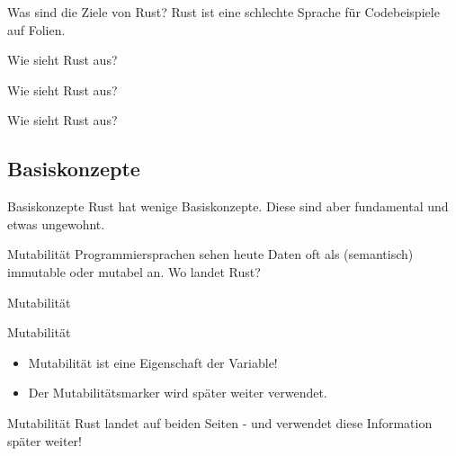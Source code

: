 \documentclass{beamer}
\begin{document}
\begin{frame}{Was sind die Ziele von Rust?}
	Rust ist eine schlechte Sprache für Codebeispiele auf Folien.
\end{frame}

\begin{frame}{Wie sieht Rust aus?}
\end{frame}

\begin{frame}{Wie sieht Rust aus?}
\end{frame}

\begin{frame}{Wie sieht Rust aus?}
\end{frame}

\subsection{Basiskonzepte}

\begin{frame}{Basiskonzepte}
	Rust hat wenige Basiskonzepte. Diese sind aber fundamental und etwas ungewohnt.
\end{frame}

\begin{frame}{Mutabilität}
	Programmiersprachen sehen heute Daten oft als (semantisch) immutable oder mutabel an. Wo landet Rust?
\end{frame}

\begin{frame}{Mutabilität}
\end{frame}

\begin{frame}{Mutabilität}

	\begin{itemize}
		\item Mutabilität ist eine Eigenschaft der Variable!
		\item Der Mutabilitätsmarker wird später weiter verwendet.
	\end{itemize}
\end{frame}

\begin{frame}{Mutabilität}
	Rust landet auf beiden Seiten - und verwendet diese Information später weiter!
\end{frame}
\end{document}
